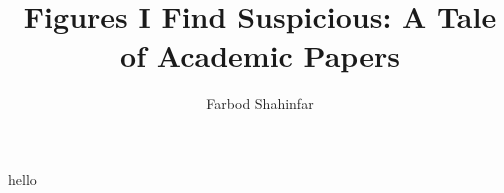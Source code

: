 \documentclass{article}
\title{Figures I Find Suspicious: A Tale of Academic Papers}
\author{Farbod Shahinfar}
\begin{document}
\maketitle{}

hello
\end{document}
